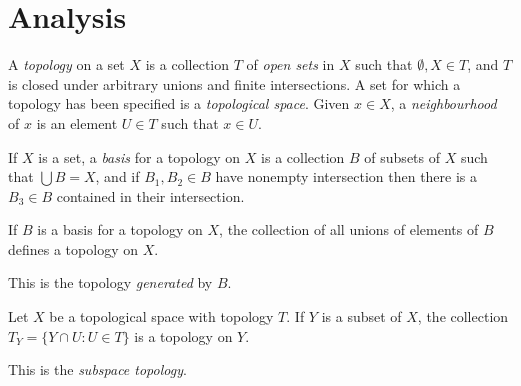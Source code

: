 \section{Analysis}
\begin{defn}
    A \emph{topology} on a set $X$ is a collection $T$ of \emph{open sets} in
    $X$ such that $\emptyset, X\in T$, and $T$ is closed under arbitrary unions
    and finite intersections. A set for which a topology has been specified is a
    \emph{topological space}. Given $x\in X$, a \emph{neighbourhood} of $x$ is
    an element $U\in T$ such that $x\in U$.
\end{defn}
\begin{defn}
    If $X$ is a set, a \emph{basis} for a topology on $X$ is a collection $B$ of
    subsets of $X$ such that $\bigcup B=X$, and if $B_1,B_2\in B$ have nonempty
    intersection then there is a $B_3\in B$ contained in their intersection.
\end{defn}
\begin{prop}
    If $B$ is a basis for a topology on $X$, the collection of all unions of
    elements of $B$ defines a topology on $X$.
\end{prop}
\begin{defn}
    This is the topology \emph{generated} by $B$.
\end{defn}
\begin{prop}
    Let $X$ be a topological space with topology $T$. If $Y$ is a subset of $X$,
    the collection $T_Y=\{Y\cap U:U\in T\}$ is a topology on $Y$.
\end{prop}
\begin{defn}
    This is the \emph{subspace topology}.
\end{defn}
